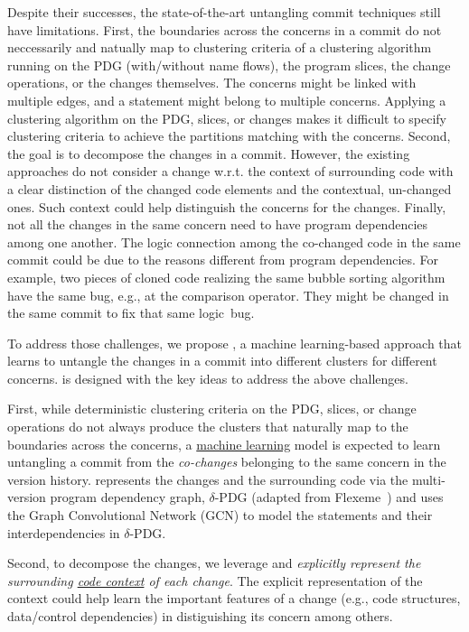 
Despite their successes, the state-of-the-art untangling commit
techniques still have limitations. First, the boundaries across the
concerns in a commit do not neccessarily and natually map to
clustering criteria of a clustering algorithm running on the PDG
(with/without name flows), the program slices, the change operations,
or the changes themselves. The concerns might be linked with multiple
edges, and a statement might belong to multiple concerns. Applying a
clustering algorithm on the PDG, slices, or changes makes it difficult
to specify clustering criteria to achieve the partitions matching with
the concerns.
%
Second, the goal is to decompose the changes in a commit. However, the
existing approaches do not consider a change w.r.t. the context of
surrounding code with a clear distinction of the changed code elements
and the contextual, un-changed ones. Such context could help
distinguish the concerns for the changes. Finally, not all the changes
in the same concern need to have program dependencies among one
another. The logic connection among the co-changed code in the same
commit could be due to the reasons different from program
dependencies. For example, two pieces of cloned code realizing the
same bubble sorting algorithm have the same bug, e.g., at the
comparison operator. They might be changed in the same commit to fix
that same logic~bug.

To address those challenges, we propose {\tool}, a machine
learning-based approach that learns to untangle the changes in a
commit into different clusters for different concerns. {\tool} is
designed with the key ideas to address the above challenges.

First, while deterministic clustering criteria on the PDG, slices, or
change operations do not always produce the clusters that naturally
map to the boundaries across the concerns, a \underline{machine
  learning} model is expected to learn untangling a commit from the
{\em co-changes} belonging to the same concern in the version history.
%
{\tool} represents the changes and the surrounding code via the
multi-version program dependency graph, $\delta$-PDG (adapted from
Flexeme~\cite{flexeme-fse20}) and uses the Graph Convolutional Network
(GCN) to model the statements and their interdependencies in
$\delta$-PDG.

Second, to decompose the changes, we leverage and {\em
  explicitly represent the surrounding \underline{code context} of
  each change}. The explicit representation of the context could help
{\tool} learn the important features of a change (e.g., code
structures, data/control dependencies) in distiguishing its concern
among others.

